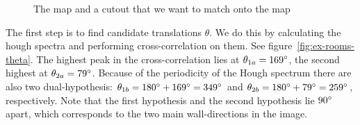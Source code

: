 \begin{figure}[ht]
\centering
{}
\caption{The map and a cutout that we want to match onto the map}
\label{fig:ex-rooms}
\end{figure}

The first step is to find candidate translations $\theta$. We do this by calculating the hough spectra and performing cross-correlation on them. See figure~\ref{fig:ex-rooms-theta}. The highest peak in the cross-correlation lies at $\theta_{1a} = 169\degree$, the second highest at $\theta_{2a} = 79\degree$. Because of the periodicity of the Hough spectrum there are also two dual-hypothesis: $\theta_{1b} = 180\degree+169\degree = 349\degree$ and $\theta_{2b} = 180\degree+79\degree = 259\degree$, respectively. Note that the first hypothesis and the second hypothesis lie $90\degree$ apart, which corresponds to the two main wall-directions in the image.

